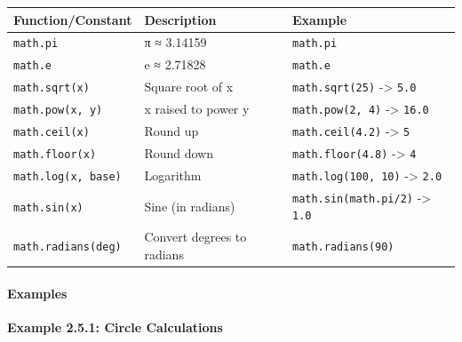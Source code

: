 \documentclass[
  justified,
  openright,
]{tufte-book}
\let\subsubsection\paragraph
\let\paragraph\paragraph
\let\subsubsection\paragraph
\let\paragraph\paragraph
\begin{document}
{\def\LTcaptype{none} %
\begin{longtable}[]{@{}
  >{\raggedright\arraybackslash}p{}
  >{\raggedright\arraybackslash}p{}
  >{\raggedright\arraybackslash}p{}@{}}
\toprule\noalign{}
\begin{minipage}[b]{\linewidth}\raggedright
Function/Constant
\end{minipage} & \begin{minipage}[b]{\linewidth}\raggedright
Description
\end{minipage} & \begin{minipage}[b]{\linewidth}\raggedright
Example
\end{minipage} \\
\midrule\noalign{}
\endhead
\bottomrule\noalign{}
\endlastfoot
\texttt{math.pi} & π ≈ 3.14159 & \texttt{math.pi} \\
\texttt{math.e} & e ≈ 2.71828 & \texttt{math.e} \\
\texttt{math.sqrt(x)} & Square root of x & \texttt{math.sqrt(25)}
-\textgreater{} \texttt{5.0} \\
\texttt{math.pow(x,\ y)} & x raised to power y &
\texttt{math.pow(2,\ 4)} -\textgreater{} \texttt{16.0} \\
\texttt{math.ceil(x)} & Round up & \texttt{math.ceil(4.2)}
-\textgreater{} \texttt{5} \\
\texttt{math.floor(x)} & Round down & \texttt{math.floor(4.8)}
-\textgreater{} \texttt{4} \\
\texttt{math.log(x,\ base)} & Logarithm & \texttt{math.log(100,\ 10)}
-\textgreater{} \texttt{2.0} \\
\texttt{math.sin(x)} & Sine (in radians) & \texttt{math.sin(math.pi/2)}
-\textgreater{} \texttt{1.0} \\
\texttt{math.radians(deg)} & Convert degrees to radians &
\texttt{math.radians(90)} \\
\end{longtable}
}

\subsubsection{Examples}\label{examples-5}

\textbf{Example 2.5.1: Circle Calculations}
\end{document}
